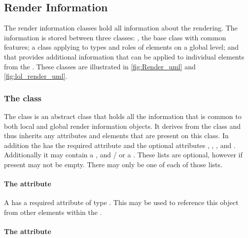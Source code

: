 \subsection{Render Information}
\label{renderinformation-class}
The render information classes hold all information about the rendering. The
information is stored between three classes: \RenderInformationBase, the base class with 
common features; \GlobalRenderInformation a class applying to types and roles of 
elements on a global level; and \LocalRenderInformation that provides additional information that can be applied to individual elements from the \LayoutPackage. These classes are illustrated in \ref{fig:Render_uml} and \ref{fig:lol_render_uml}.

\subsubsection{The  class}
\label{renderinformationbase-class}

The \RenderInformationBase class is an abstract class that holds all the 
information that is common to both local and global render 
information objects. It  derives from the \SBase class and thus
inherits any attributes and elements that are present on this class. In 
addition the \RenderInformationBase has the required attribute  and the 
optional attributes , , , 
 and . Additionally it may
contain a \ListOfColorDefinitions, \ListOfGradientDefinitions and / or a \ListOfLineEndings. 
These lists are optional, however if present may not be empty. There may only be one 
of each of those lists. 

\paragraph{The \fixttspace{} attribute}

A \RenderInformationBase has a required attribute  of type
. This  may be used to reference this \RenderInformation 
object from other elements within the \RenderPackage.

\paragraph{The \fixttspace{} attribute}

